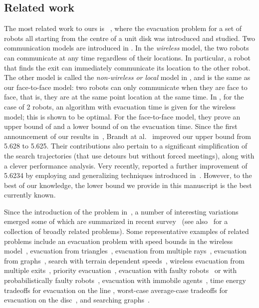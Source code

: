 \documentclass[
final
]{dmtcs-episciences}
\newcommand{\ff}{face-to-face }
\theoremstyle{definition}
\begin{document}
\subsection{Related work}
\label{sec: related work}




The most related work to ours is ~\cite{CGGKMP}, where the evacuation problem for a set of robots all
starting from the centre of a unit disk was introduced and studied.  Two communication models are introduced in \cite{CGGKMP}. In the {\em wireless} model,
the two robots can communicate at any time regardless of their locations. In particular, a robot that finds the exit can immediately communicate its location to the other
robot. The other model is called the  {\em non-wireless or local} model in \cite{CGGKMP}, and is the same as our \ff model:  two robots can only communicate when they are face to face,  that is, they are at the same point location at the same time. In \cite{CGGKMP}, for the case of 2 robots, an algorithm with  evacuation time  is  given for the wireless model; this is shown to be optimal. For the \ff  model,  they prove an upper bound of 
 and a lower bound of   on the evacuation time. 
Since the first announcement of our results in~\cite{CzyzowiczGKNOV15}, 
Brandt at al.~\cite{Watten2017} improved our upper bound from 5.628 to 5.625. Their contributions also pertain to a significant simplification of the search trajectories (that use detours but without forced meetings), along with a clever performance analysis. 
Very recently, \cite{disser2019evacuating} reported a further improvement of 5.6234 by employing and generalizing techniques introduced in~\cite{Watten2017}.
However, to the best of our knowledge, the lower bound we provide in this manuscript is the best currently known. 

Since the introduction of the problem in~\cite{CGGKMP}, a number of interesting variations emerged some of which are summarized in recent survey~\cite{CGK19search} (see also~\cite{flocchini2019distributed} for a collection of broadly related problems).
Some representative examples of related problems include 
an evacuation problem with speed bounds in the wireless model~\cite{lamprou2016fast},
evacuation from triangles~\cite{CzyzowiczKKNOS15,ChuangpishitMNO17},
evacuation from multiple rays~\cite{BrandtFRW20},
evacuation from graphs~\cite{Borowiecki0DK16},
search with terrain dependent speeds~\cite{CzyzowiczKKNOS17},
wireless evacuation from multiple exits~\cite{czyzowicz2018evacuating,PattanayakR0S18},
priority evacuation~\cite{CGKKKNOS18b,CzyzowiczGKKKNO18},
evacuation with faulty robots~\cite{czyzowicz2017evacuation,pattanayak2019chauffeuring,GKLPP19Algosensors} or with probabilistically faulty robots~\cite{bgmp2020probabilistically},	
evacuation with immobile agents~\cite{GKKa16,dmtcs:5528},
time energy tradeoffs for evacuation on the line \cite{czyzowiczICALP2019,kranakis2009time},
worst-case average-case tradeoffs for evacuation on the disc~\cite{chuangpishit2018average}, 
and searching graphs~\cite{angelopoulos2019expanding}.
\end{document}
